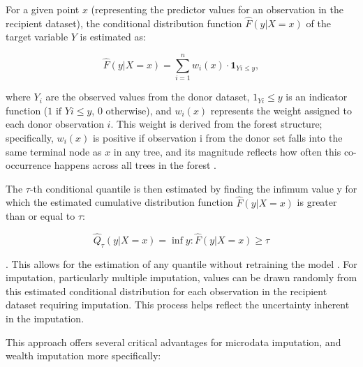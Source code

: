For a given point $x$ (representing the predictor values for an observation in the recipient dataset), the conditional distribution function $\hat{F}(y|X=x)$ of the target variable $Y$ is estimated as:

$$\hat{F}(y|X=x) = \sum_{i=1}^n w_i(x) \cdot \mathbf{1}_{{Yi \leq y}},$$

where $Y_i$ are the observed values from the donor dataset, $1_{Yi} \leq y$ is an indicator function ($1 \text{ if } Yi \leq y$, $0 \text{ otherwise}$), and $w_i(x)$ represents the weight assigned to each donor observation $i$. This weight is derived from the forest structure; specifically, $w_i(x)$ is positive if observation i from the donor set falls into the same terminal node as $x$ in any tree, and its magnitude reflects how often this co-occurrence happens across all trees in the forest \citep{kleinke2023robust}.

The $\tau$-th conditional quantile is then estimated by finding the infimum value y for which the estimated cumulative distribution function $\hat{F}(y|X=x)$ is greater than or equal to $\tau$:

$$\hat{Q}_\tau(y|X=x) = \inf{y: \hat{F}(y|X=x) \geq \tau}$$

\citep{meinshausen2006quantile}. This allows for the estimation of any quantile without retraining the model \citep{woodruff2024enhancing}. For imputation, particularly multiple imputation, values can be drawn randomly from this estimated conditional distribution for each observation in the recipient dataset requiring imputation. This process helps reflect the uncertainty inherent in the imputation.

This approach offers several critical advantages for microdata imputation, and wealth imputation more specifically:

